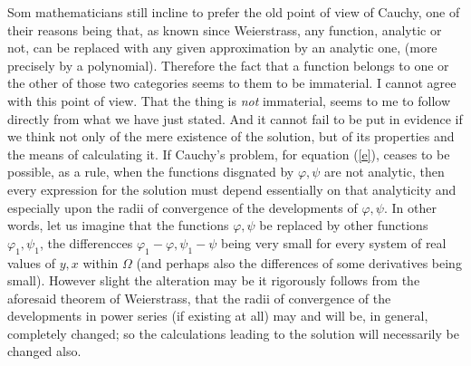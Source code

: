 \documentclass[12pt,oneside]{book}
\newcommand{\iit}[1]{\textit{#1}}
\begin{document}
Som mathematicians still incline to prefer the old point of view of Cauchy, one of their reasons being that, as known since Weierstrass, any function, analytic or not, can be replaced with any given approximation by an analytic one, (more precisely by a polynomial). Therefore the fact that a function belongs to one or the other of those two categories seems to them to be immaterial. I cannot agree with this point of view. That the thing is \iit{not} immaterial, seems to me to follow directly from what we have just stated. And it cannot fail to be put in evidence if we think not only of the mere existence of the solution, but of its properties and the means of calculating it. If Cauchy's problem, for equation (\ref{e}), ceases to be possible, as a rule, when the functions disgnated by $\varphi,\psi$ are not analytic, then every expression for the solution must depend essentially on that analyticity and especially upon the radii of convergence of the developments of $\varphi,\psi$. In other words, let us imagine that the functions $\varphi,\psi$ be replaced by other functions $\varphi_1,\psi_1$, the differencces $\varphi_1-\varphi,\psi_1-\psi$ being very small for every system of real values of $y,x$ within $\Omega$ (and perhaps also the differences of some derivatives being small). However slight the alteration may be it rigorously follows from the aforesaid theorem of Weierstrass, that the radii of convergence of the developments in power series (if existing at all) may and will be, in general, completely changed; so the calculations leading to the solution will necessarily be changed also. \par 
\end{document}

